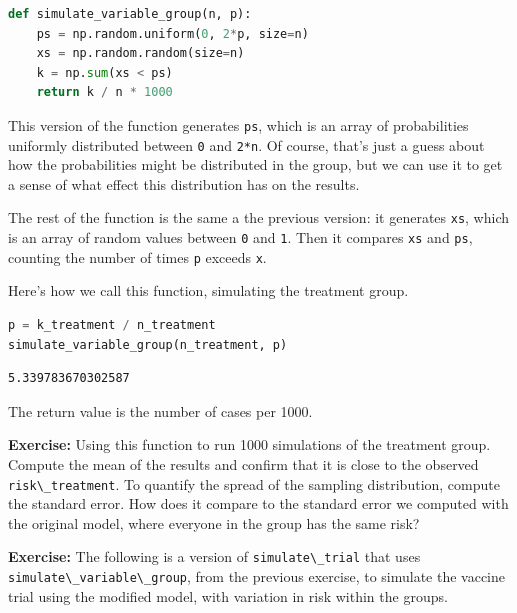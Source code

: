 \begin{lstlisting}[language=Python,style=source]
def simulate_variable_group(n, p):
    ps = np.random.uniform(0, 2*p, size=n)
    xs = np.random.random(size=n)
    k = np.sum(xs < ps)
    return k / n * 1000
\end{lstlisting}

This version of the function generates \passthrough{\lstinline!ps!},
which is an array of probabilities uniformly distributed between
\passthrough{\lstinline!0!} and \passthrough{\lstinline!2*n!}. Of
course, that's just a guess about how the probabilities might be
distributed in the group, but we can use it to get a sense of what
effect this distribution has on the results.

The rest of the function is the same a the previous version: it
generates \passthrough{\lstinline!xs!}, which is an array of random
values between \passthrough{\lstinline!0!} and
\passthrough{\lstinline!1!}. Then it compares
\passthrough{\lstinline!xs!} and \passthrough{\lstinline!ps!}, counting
the number of times \passthrough{\lstinline!p!} exceeds
\passthrough{\lstinline!x!}.

Here's how we call this function, simulating the treatment group.

\begin{lstlisting}[language=Python,style=source]
p = k_treatment / n_treatment
simulate_variable_group(n_treatment, p)
\end{lstlisting}

\begin{lstlisting}[style=output]
5.339783670302587
\end{lstlisting}

The return value is the number of cases per 1000.

\textbf{Exercise:} Using this function to run 1000 simulations of the
treatment group. Compute the mean of the results and confirm that it is
close to the observed \passthrough{\lstinline!risk\_treatment!}. To
quantify the spread of the sampling distribution, compute the standard
error. How does it compare to the standard error we computed with the
original model, where everyone in the group has the same risk?

\textbf{Exercise:} The following is a version of
\passthrough{\lstinline!simulate\_trial!} that uses
\passthrough{\lstinline!simulate\_variable\_group!}, from the previous
exercise, to simulate the vaccine trial using the modified model, with
variation in risk within the groups.

